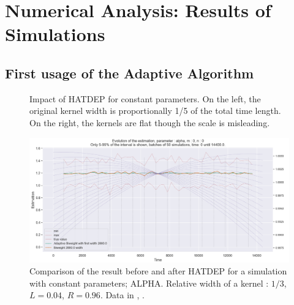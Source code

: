 \chapter{Numerical Analysis: Results of Simulations}


\section{First usage of the Adaptive Algorithm}


\begin{figure}
\centering
{} 
\caption{Impact of HATDEP for constant parameters. On the left, the original kernel width is proportionally 1/5 of the total time length. On the right, the kernels are flat though the scale is misleading.}
\label{fig:compar_kernels_0}
\end{figure}


\begin{figure}
\centering
\includegraphics[width = 0.90 \textwidth]{../imag/chap3/0/A.png}
\caption{Comparison of the result before and after HATDEP for a simulation with constant parameters; ALPHA. Relative width of a kernel : $1/3$, $L = 0.04$, $R = 0.96$. Data in \protect {}, \protect {}.}
\label{fig:first_estimate_0_alpha}
\end{figure}

